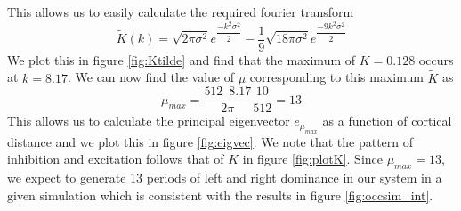 \documentclass{article}
\begin{document}
This allows us to easily calculate the required fourier transform
\begin{equation}
\tilde K(k) = \sqrt{2 \pi \sigma^2} e^{ \dfrac{- k^2 \sigma^2}{2} } - \dfrac{1}{9} \sqrt{18 \pi \sigma^2 } e^{\dfrac{-9 k^2 \sigma^2}{2}}
\end{equation}
We plot this in figure \ref{fig:Ktilde} and find that the maximum of $\tilde K = 0.128$ occurs at $k = 8.17$. We can now find the value of $\mu$ corresponding to this maximum $\tilde K$ as
\begin{equation}
\mu_{max} = \dfrac{512 \,\,\, 8.17}{2 \pi} \dfrac{10}{512} = 13
\end{equation}
This allows us to calculate the principal eigenvector $e_{\mu_{max}}$ as a function of cortical distance and we plot this in figure \ref{fig:eigvec}. We note that the pattern of inhibition and excitation follows that of $K$ in figure \ref{fig:plotK}.
Since $\mu_{max}=13$, we expect to generate 13 periods of left and right dominance in our system in a given simulation which is consistent with the results in figure \ref{fig:occsim_int}. 
\end{document}
